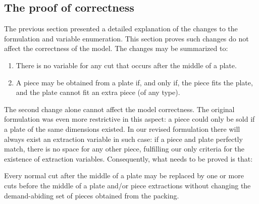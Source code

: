 \documentclass[smallextended]{svjour3}       %
\begin{document}
\subsection{The proof of correctness}

The previous section presented a detailed explanation of the changes to the formulation and variable enumeration.
This section proves such changes do not affect the correctness of the model.
The changes may be summarized to:

\begin{enumerate}
\item There is no variable for any cut that occurs after the middle of a plate.
\item A piece may be obtained from a plate if, and only if, the piece fits the plate, and the plate cannot fit an extra piece (of any type).
\end{enumerate}

The second change alone cannot affect the model correctness.
The original formulation was even more restrictive in this aspect:
a piece could only be sold if a plate of the same dimensions existed.
In our revised formulation there will always exist an extraction variable in such case:
if a piece and plate perfectly match, there is no space for any other piece, fulfilling our only criteria for the existence of extraction variables.
Consequently, what needs to be proved is that:

\begin{theorem}
Every normal cut after the middle of a plate may be replaced by one or more cuts before the middle of a plate and/or piece extractions without changing the demand-abiding set of pieces obtained from the packing.
\end{theorem}
\end{document}

